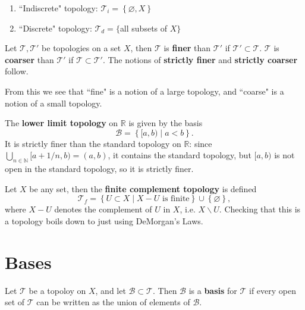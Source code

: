 \documentclass[10pt]{report}
\begin{document}
\begin{ex}
\begin{enumerate}
	\item ``Indiscrete" topology: $\mathcal{T}_i = \left\{ \varnothing, X \right\}$ 
	\item ``Discrete" topology: $\mathcal{T}_d =\{$all subsets of $X\}$
\end{enumerate}
\end{ex}

\begin{defn}
	Let $\mathcal{T},\mathcal{T}'$ be topologies on a set $X$, then $\mathcal{T}$ is \textbf{finer} than $\mathcal{T}'$ if $\mathcal{T}' \subset \mathcal{T}$. $\mathcal{T}$ is \textbf{coarser} than $\mathcal{T}'$ if $\mathcal{T} \subset \mathcal{T}'$. The notions of \textbf{strictly finer} and \textbf{strictly coarser} follow.
\end{defn}

From this we see that ``fine" is a notion of a large topology, and ``coarse" is a notion of a small topology.

\begin{ex}[]
	The \textbf{lower limit topology} on $\mathbb{R}$ is given by the basis
	\[
		\mathcal{B}= \left\{ [a,b) \;|\; a < b \right\}.
	\] It is strictly finer than the standard topology on $\mathbb{R}$: since $\bigcup_{n\in \mathbb{N}}[a + 1/n, b)=(a,b)$, it contains the standard topology, but $[a,b)$ is not open in the standard topology, so it is strictly finer.
\end{ex}

\begin{ex}[]
	Let $X$ be any set, then the \textbf{finite complement topology} is defined
	\[
		\mathcal{T}_f = \left\{ U \subset X \;|\; X-U \text{ is finite} \right\} \cup\left\{ \varnothing \right\},
	\] 
	where $X-U$ denotes the complement of $U$ in $X$, i.e. $X \backslash U$. Checking that this is a topology boils down to just using DeMorgan's Laws.
\end{ex}


\section{Bases}

\begin{defn}
Let $\mathcal{T}$ be a topoloy on $X$, and let $\mathcal{B} \subset \mathcal{T}$. Then $\mathcal{B}$ is a \textbf{basis} for $\mathcal{T}$ if every open set of $\mathcal{T}$ can be written as the union of elements of $\mathcal{B}$.
\end{defn}
\end{document}
